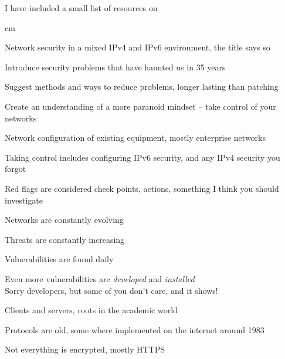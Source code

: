 \documentclass[Screen16to9,17pt]{foils}
\newcommand{\myalert}{\color{red}\faFlag}
\begin{document}
I have included a small list of resources on \pageref{resources}

 cm


\begin{list2}
\item Network security in a mixed IPv4 and IPv6 environment, the title says so \smiley
\item Introduce security problems that have haunted us in 35 years
\item Suggest methods and ways to reduce problems, longer lasting than patching
\item Create an understanding of a more paranoid mindset -- take control of your networks
\item Network configuration of existing equipment, mostly enterprise networks
\item Taking control includes configuring IPv6 security, and any IPv4 security you forgot {\myalert}
\end{list2}
{\small Red flags are considered check points, actions, something I think you should investigate}



\begin{list2}
\item Networks are constantly evolving
\item Threats are constantly increasing
\item Vulnerabilities are found daily
\item Even more vulnerabilities are \emph{developed} and \emph{installed}\\
Sorry developers, but some of you don't care, and it shows!
\end{list2}




\begin{list1}
\item Clients and servers, roots in the academic world
\item Protocols are old, some where implemented on the internet around 1983
\item Not everything is encrypted, mostly HTTPS
\end{list1}
\end{document}
